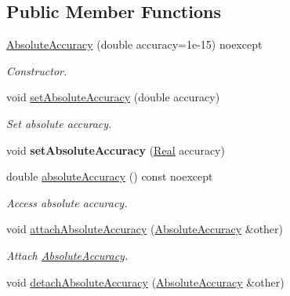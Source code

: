 \subsection*{Public Member Functions}
\begin{DoxyCompactItemize}
\item 
\hyperlink{classSpacy_1_1Mixin_1_1AbsoluteAccuracy_a98b58fa749e9b5363eb23a94011e7a67_a98b58fa749e9b5363eb23a94011e7a67}{Absolute\+Accuracy} (double accuracy=1e-\/15) noexcept
\begin{DoxyCompactList}\small\item\em Constructor. \end{DoxyCompactList}\item 
void \hyperlink{classSpacy_1_1Mixin_1_1AbsoluteAccuracy_a71cfcdc0c504be63c18c3e78df157738_a71cfcdc0c504be63c18c3e78df157738}{set\+Absolute\+Accuracy} (double accuracy)
\begin{DoxyCompactList}\small\item\em Set absolute accuracy. \end{DoxyCompactList}\item 
\hypertarget{classSpacy_1_1Mixin_1_1AbsoluteAccuracy_ad099a4a0a770133b56acaaf8783d4ba6}{}void {\bfseries set\+Absolute\+Accuracy} (\hyperlink{classSpacy_1_1Real}{Real} accuracy)\label{classSpacy_1_1Mixin_1_1AbsoluteAccuracy_ad099a4a0a770133b56acaaf8783d4ba6}

\item 
double \hyperlink{classSpacy_1_1Mixin_1_1AbsoluteAccuracy_aaa1fbd611cf85a098b71c22986778d8a_aaa1fbd611cf85a098b71c22986778d8a}{absolute\+Accuracy} () const noexcept
\begin{DoxyCompactList}\small\item\em Access absolute accuracy. \end{DoxyCompactList}\item 
void \hyperlink{classSpacy_1_1Mixin_1_1AbsoluteAccuracy_a05e2d07ee0ea883abf84a8c77e951cd8_a05e2d07ee0ea883abf84a8c77e951cd8}{attach\+Absolute\+Accuracy} (\hyperlink{classSpacy_1_1Mixin_1_1AbsoluteAccuracy}{Absolute\+Accuracy} \&other)
\begin{DoxyCompactList}\small\item\em Attach \hyperlink{classSpacy_1_1Mixin_1_1AbsoluteAccuracy}{Absolute\+Accuracy}. \end{DoxyCompactList}\item 
\hypertarget{classSpacy_1_1Mixin_1_1AbsoluteAccuracy_a8520fbc86f1b8a4dd1536683e925be1c}{}void \hyperlink{classSpacy_1_1Mixin_1_1AbsoluteAccuracy_a8520fbc86f1b8a4dd1536683e925be1c}{detach\+Absolute\+Accuracy} (\hyperlink{classSpacy_1_1Mixin_1_1AbsoluteAccuracy}{Absolute\+Accuracy} \&other)\label{classSpacy_1_1Mixin_1_1AbsoluteAccuracy_a8520fbc86f1b8a4dd1536683e925be1c}


\end{DoxyCompactItemize}
